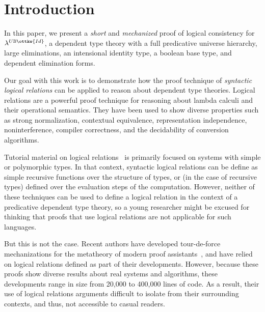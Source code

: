 \documentclass[acmsmall,screen=true,
\ifpublic review=false\else,review=true\fi
  ,anonymous=\ifanonymous true\else false\fi]{acmart}
\newcommand{\lang}{$\lambda^{U\mathbb{B}\ottkw{Id}}$\xspace}
\newcommand{\scw}[1]{}
\begin{document}
\maketitle

\section{Introduction}
In this paper, we present a \emph{short} and \emph{mechanized} proof of
logical consistency for \lang{}, a dependent type theory with a full
predicative universe hierarchy, large eliminations, an intensional identity
type, a boolean base type, and dependent elimination forms.

Our goal with this work is to demonstrate how the proof technique of
\emph{syntactic logical relations} can be applied to reason about dependent
type theories.  Logical relations are a powerful proof technique for reasoning
about lambda calculi and their operational semantics. They have been used to
show diverse properties such as strong normalization, contextual equivalence,
representation independence, noninterference, compiler correctness, and the
decidability of conversion algorithms. \scw{add citations? emphasize that we are working
with syntactic logical relations.}

Tutorial material on logical relations~\citep{skorstengaard2019introduction,
  harpertait, harperkripke, pierce2002types,
  pierce2004advanced,harper2016practical} is primarily focused on systems
with simple or polymorphic types. In that context, syntactic logical relations
can be define as simple recursive functions over the structure of types, or
(in the case of recursive types) defined over the evaluation steps of the
computation. However, neither of these techniques can be used to define a
logical relation in the context of a predicative dependent type theory, so a
young researcher might be excused for thinking that proofs that use logical
relations are not applicable for such languages.

But this is not the case. \scw{Add a sentence about pen-and-paper LR proofs for dependent type theories}
Recent authors have developed tour-de-force
mechanizations for the metatheory of modern proof
assistants~\citep{nbeincoq,decagda,martin-lof-a-la-coq,anand2014towards}, and
have relied on logical relations defined as part of their
developments. However, because these proofs show diverse results about real
systems and algorithms, these developments range in size from 20,000 to
400,000 lines of code. As a result, their use of logical relations arguments
difficult to isolate from their surrounding contexts, and thus, not accessible
to casual readers.
\end{document}
